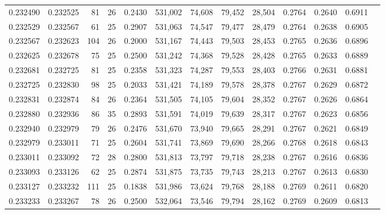 \begin{tabular}{rrrrrrrrrrrrr}
0.232490 & 0.232525 &  81 &  26 &                                     0.2430 & 531,002 &  74,608 &  79,452 &  28,504 & 0.2764 & 0.2640 & 0.6911 \\
0.232529 & 0.232567 &  61 &  25 &                                     0.2907 & 531,063 &  74,547 &  79,477 &  28,479 & 0.2764 & 0.2638 & 0.6905 \\
0.232567 & 0.232623 & 104 &  26 &                                     0.2000 & 531,167 &  74,443 &  79,503 &  28,453 & 0.2765 & 0.2636 & 0.6896 \\
0.232625 & 0.232678 &  75 &  25 &                                     0.2500 & 531,242 &  74,368 &  79,528 &  28,428 & 0.2765 & 0.2633 & 0.6889 \\
0.232681 & 0.232725 &  81 &  25 &                                     0.2358 & 531,323 &  74,287 &  79,553 &  28,403 & 0.2766 & 0.2631 & 0.6881 \\
0.232725 & 0.232830 &  98 &  25 &                                     0.2033 & 531,421 &  74,189 &  79,578 &  28,378 & 0.2767 & 0.2629 & 0.6872 \\
0.232831 & 0.232874 &  84 &  26 &                                     0.2364 & 531,505 &  74,105 &  79,604 &  28,352 & 0.2767 & 0.2626 & 0.6864 \\
0.232880 & 0.232936 &  86 &  35 &                                     0.2893 & 531,591 &  74,019 &  79,639 &  28,317 & 0.2767 & 0.2623 & 0.6856 \\
0.232940 & 0.232979 &  79 &  26 &                                     0.2476 & 531,670 &  73,940 &  79,665 &  28,291 & 0.2767 & 0.2621 & 0.6849 \\
0.232979 & 0.233011 &  71 &  25 &                                     0.2604 & 531,741 &  73,869 &  79,690 &  28,266 & 0.2768 & 0.2618 & 0.6843 \\
0.233011 & 0.233092 &  72 &  28 &                                     0.2800 & 531,813 &  73,797 &  79,718 &  28,238 & 0.2767 & 0.2616 & 0.6836 \\
0.233093 & 0.233126 &  62 &  25 &                                     0.2874 & 531,875 &  73,735 &  79,743 &  28,213 & 0.2767 & 0.2613 & 0.6830 \\
0.233127 & 0.233232 & 111 &  25 &                                     0.1838 & 531,986 &  73,624 &  79,768 &  28,188 & 0.2769 & 0.2611 & 0.6820 \\
0.233233 & 0.233267 &  78 &  26 &                                     0.2500 & 532,064 &  73,546 &  79,794 &  28,162 & 0.2769 & 0.2609 & 0.6813 \\

\end{tabular}
